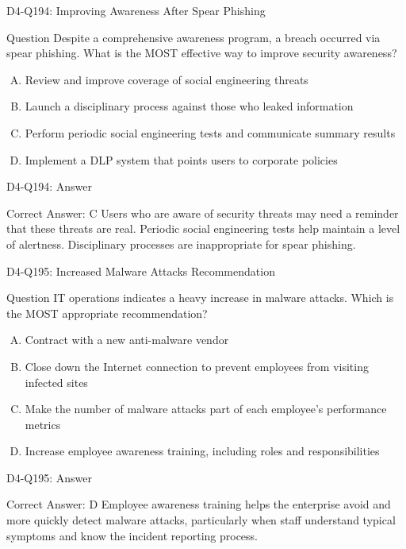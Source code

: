\documentclass{beamer}
\begin{document}
	\begin{frame}{D4-Q194: Improving Awareness After Spear Phishing}
		\begin{block}{Question}
			Despite a comprehensive awareness program, a breach occurred via spear phishing. What is the MOST effective way to improve security awareness?
		\end{block}
		\begin{enumerate}[(A)]
			\item Review and improve coverage of social engineering threats
			\item Launch a disciplinary process against those who leaked information
			\item Perform periodic social engineering tests and communicate summary results
			\item Implement a DLP system that points users to corporate policies
		\end{enumerate}
	\end{frame}
	\begin{frame}{D4-Q194: Answer}
		\begin{block}{Correct Answer: C}
			Users who are aware of security threats may need a reminder that these threats are real. Periodic social engineering tests help maintain a level of alertness. Disciplinary processes are inappropriate for spear phishing.
		\end{block}
	\end{frame}
	
	\begin{frame}{D4-Q195: Increased Malware Attacks Recommendation}
		\begin{block}{Question}
			IT operations indicates a heavy increase in malware attacks. Which is the MOST appropriate recommendation?
		\end{block}
		\begin{enumerate}[(A)]
			\item Contract with a new anti-malware vendor
			\item Close down the Internet connection to prevent employees from visiting infected sites
			\item Make the number of malware attacks part of each employee's performance metrics
			\item Increase employee awareness training, including roles and responsibilities
		\end{enumerate}
	\end{frame}
	\begin{frame}{D4-Q195: Answer}
		\begin{block}{Correct Answer: D}
			Employee awareness training helps the enterprise avoid and more quickly detect malware attacks, particularly when staff understand typical symptoms and know the incident reporting process.
		\end{block}
	\end{frame}
	
\end{document}
